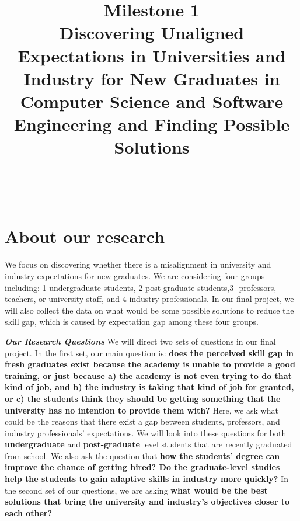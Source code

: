 \documentclass{sigchi}
\begin{document}
\title{Milestone 1\\ Discovering Unaligned Expectations in Universities and Industry for New Graduates in Computer Science and Software Engineering and Finding Possible Solutions}

\author{%
  \\
  \\
}

\maketitle

\section{About our research}
We focus on discovering whether there is a misalignment in university and industry expectations for new graduates. We are considering four groups including: 1-undergraduate students, 2-post-graduate students,3- professors, teachers, or university staff, and 4-industry professionals. In our final project, we will also collect the data on what would be some possible solutions to reduce the skill gap, which is caused by expectation gap among these four groups.

\textit{\textbf{Our Research Questions}}\newline
We will direct two sets of questions in our final project. In the first set, our main question is: \textbf{does the perceived skill gap in fresh graduates exist because the academy is unable to provide a good training, or just because a) the academy is not even trying to do that kind of job, and b) the industry is taking that kind of job for granted, or c) the students think they should be getting something that the university has no intention to provide them with?} Here, we ask what could be the reasons that there exist a gap between students, professors, and industry professionals' expectations. We will look into these questions for both \textbf{undergraduate} and \textbf{post-graduate} level students that are recently graduated from school. We also ask the question that \textbf{how the students' degree can improve the chance of getting hired? Do the graduate-level studies help the students to gain adaptive skills in industry more quickly?}\newline
In the second set of our questions, we are asking \textbf{what would be the best solutions that bring the university and industry's objectives closer to each other?} 
\end{document}
